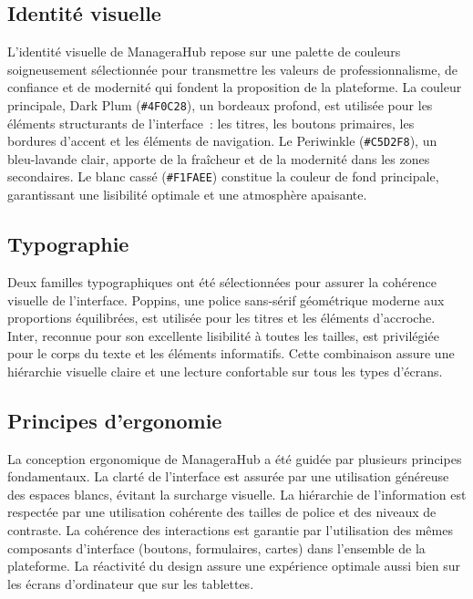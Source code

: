 \documentclass[12pt,a4paper]{report}
\begin{document}
\subsection{Identité visuelle}

L'identité visuelle de ManageraHub repose sur une palette de couleurs soigneusement sélectionnée pour transmettre les valeurs de professionnalisme, de confiance et de modernité qui fondent la proposition de la plateforme. La couleur principale, Dark Plum (\texttt{\#4F0C28}), un bordeaux profond, est utilisée pour les éléments structurants de l'interface~: les titres, les boutons primaires, les bordures d'accent et les éléments de navigation. Le Periwinkle (\texttt{\#C5D2F8}), un bleu-lavande clair, apporte de la fraîcheur et de la modernité dans les zones secondaires. Le blanc cassé (\texttt{\#F1FAEE}) constitue la couleur de fond principale, garantissant une lisibilité optimale et une atmosphère apaisante.

\subsection{Typographie}

Deux familles typographiques ont été sélectionnées pour assurer la cohérence visuelle de l'interface. Poppins, une police sans-sérif géométrique moderne aux proportions équilibrées, est utilisée pour les titres et les éléments d'accroche. Inter, reconnue pour son excellente lisibilité à toutes les tailles, est privilégiée pour le corps du texte et les éléments informatifs. Cette combinaison assure une hiérarchie visuelle claire et une lecture confortable sur tous les types d'écrans.

\subsection{Principes d'ergonomie}

La conception ergonomique de ManageraHub a été guidée par plusieurs principes fondamentaux. La clarté de l'interface est assurée par une utilisation généreuse des espaces blancs, évitant la surcharge visuelle. La hiérarchie de l'information est respectée par une utilisation cohérente des tailles de police et des niveaux de contraste. La cohérence des interactions est garantie par l'utilisation des mêmes composants d'interface (boutons, formulaires, cartes) dans l'ensemble de la plateforme. La réactivité du design assure une expérience optimale aussi bien sur les écrans d'ordinateur que sur les tablettes.
\end{document}
